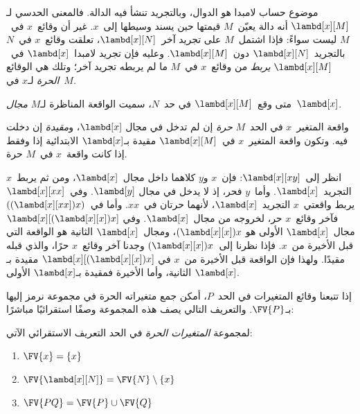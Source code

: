 \documentclass[../../../include/open-logic-section]{subfiles}
\begin{document}

موضوع حساب لامبدا هو الدوال، وبالتجريد تنشأ فيه الدالة.
فالمعنى الحدسي لـ$\lambd[x][M]$ أنه دالة يعيّن~$M$ قيمتها حين يسند وسيطها إلى~$x$.
غير أن وقائع~$x$ في~$M$ ليست سواءً: فإذا اشتمل~$M$ على تجريد آخر~$\lambd[x][N]$،
تعلقت وقائع~$x$ في~$N$ بالتجريد~$\lambd[x][N]$ دون~$\lambd[x][M]$.
وعليه فإن تجريد لامبدا~$\lambd[x]$ في~$\lambd[x][M]$ \emph{يربط}
من وقائع~$x$ في~$M$ ما لم يربطه تجريد آخر؛ وتلك هي الوقائع \emph{الحرة} لـ$x$ في~$M$.

\begin{defn}[المجال]
متى وقع~$\lambd[x][M]$ في حد~$N$، سميت الواقعة المناظرة لـ$M$
\emph{مجال}~$\lambd[x]$.
\end{defn}

\begin{defn}
  واقعة المتغير~$x$ في الحد~$M$ \emph{حرة} إن لم تدخل في مجال
  $\lambd[x]$، و\emph{مقيدة} إن دخلت فيه. وتكون واقعة المتغير~$x$
  في~$\lambd[x][M]$ مقيدة بـ$\lambd[x]$ الابتدائية إذا وفقط إذا كانت
  واقعة~$x$ في~$M$ حرة.
\end{defn}

\begin{ex}
  انظر إلى~$\lambd[x][x y]$: فإن~$x$ و$y$ كلاهما داخل مجال~$\lambd[x]$،
  ومن ثم يربط~$x$ التجريد~$\lambd[x]$. وأما~$y$ فحر، إذ لا يدخل في مجال
  $\lambd[y]$. وفي~$\lambd[x][x x]$ يربط واقعتي~$x$ التجريد~$\lambd[x]$،
  لأنهما حرتان في~$xx$. وأما في~$((\lambd[x][xx])x)$ فآخر وقائع~$x$ حر،
  لخروجه من مجال~$\lambd[x]$. وفي
  $\lambd[x][(\lambd[x][x])x]$ مجال~$\lambd[x]$ الأولى هو
  $(\lambd[x][x])x$، ومجال~$\lambd[x]$ الثانية هو الواقعة التي قبل الأخيرة
  من~$x$. فإذا نظرنا إلى~$(\lambd[x][x])x$ وجدنا آخر وقائع~$x$ حرًا،
  والذي قبله مقيدًا. ولهذا فإن الواقعة قبل الأخيرة من~$x$ في
  $\lambd[x][(\lambd[x][x])x]$ مقيدة بـ$\lambd[x]$ الثانية، وأما الأخيرة فمقيدة بـ$\lambd[x]$ الأولى.
\end{ex}

إذا تتبعنا وقائع المتغيرات في الحد~$P$، أمكن جمع متغيراته الحرة في مجموعة نرمز إليها بـ$\FV{P}$.
والتعريف التالي يصف هذه المجموعة وصفًا استقرائيًا مباشرًا:

\begin{defn} 
  لمجموعة \emph{المتغيرات الحرة} في الحد التعريف الاستقرائي الآتي:
  \begin{enumerate}
    \item $\FV{x} = \{x\}$ 
    \item $\FV{\lambd[x][N]} = \FV{N} \setminus \{x\}$    
    \item $\FV{PQ} = \FV{P} \cup \FV{Q}$ 
  \end{enumerate}
\end{defn}
\end{document}
